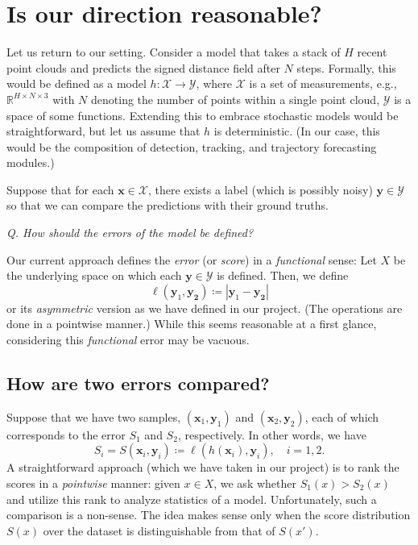 \documentclass{article}
\begin{document}
{\color{teal} 
\noindent
\section{Is our direction reasonable?}
Let us return to our setting. Consider a model that takes a stack of $H$ recent point clouds and predicts the signed distance field after $N$ steps. Formally, this would be defined as a model $h: \mathcal{X} \to \mathcal{Y}$, where
$\mathcal{X}$ is a set of measurements, e.g., $\mathbb{R}^{H \times N \times 3}$ with $N$ denoting the number of points within a single point cloud, 
$\mathcal{Y}$ is a space of some functions. Extending this to embrace stochastic models would be straightforward, but let us assume that $h$ is deterministic. (In our case, this would be the composition of detection, tracking, and trajectory forecasting modules.)

Suppose that for each $\mathbf{x} \in \mathcal{X}$, there exists a label (which is possibly noisy) $\mathbf{y} \in \mathcal{Y}$ so that we can compare the predictions with their ground truths.

\noindent
\textit{Q. How should the errors of the model be defined?}

Our current approach defines the \textit{error} (or \textit{score}) in a \textit{functional} sense:
Let $X$ be the underlying space on which each $\mathbf{y}\in \mathcal{Y}$ is defined. Then, we define
\begin{equation*}
\ell (\mathbf{y}_1, \mathbf{y_2}) \coloneqq \left|\mathbf{y}_1 - \mathbf{y_2} \right|
\end{equation*}
or its \textit{asymmetric} version as we have defined in our project. (The operations are done in a pointwise manner.)
\noindent
While this seems reasonable at a first glance, considering this \textit{functional} error may be vacuous. 
\subsection{How are two errors compared?}
Suppose that we have two samples, $(\mathbf{x}_1, \mathbf{y}_1)$ and $(\mathbf{x}_2, \mathbf{y}_2)$, each of which corresponds to the error $S_1$ and $S_2$, respectively. In other words, we have
\begin{equation*}
S_i = S(\mathbf{x}_i, \mathbf{y}_i) \coloneqq  \ell(h(\mathbf{x}_i), \mathbf{y}_i), \quad i = 1, 2.
\end{equation*}
A straightforward approach (which we have taken in our project) is to rank the scores in a \textit{pointwise} manner:
given $x\in X$, we ask whether $S_1(x) > S_2(x)$ and utilize this rank to analyze  statistics of a model. Unfortunately, such a comparison is a non-sense. The idea makes sense only when the score distribution $S(x)$ over the dataset is distinguishable from that of $S(x')$.}
\end{document}
